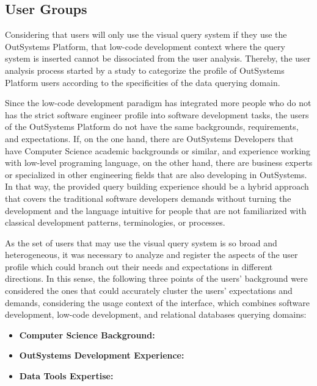 \subsection{User Groups}
\label{subsec:user_groups}

Considering that users will only use the visual query system if they use the OutSystems Platform, that low-code development context where the query system is inserted cannot be dissociated from the user analysis. Thereby, the user analysis process started by a study to categorize the profile of OutSystems Platform users according to the specificities of the data querying domain.

Since the low-code development paradigm has integrated more people who do not has the strict software engineer profile into software development tasks, the users of the OutSystems Platform do not have the same backgrounds, requirements, and expectations. If, on the one hand, there are OutSystems Developers that have Computer Science academic backgrounds or similar, and experience working with low-level programing language, on the other hand, there are business experts or specialized in other engineering fields that are also developing in OutSystems. In that way, the provided query building experience should be a hybrid approach that covers the traditional software developers demands without turning the development and the language intuitive for people that are not familiarized with classical development patterns, terminologies, or processes.

As the set of users that may use the visual query system is so broad and heterogeneous, it was necessary to analyze and register the aspects of the user profile which could branch out their needs and expectations in different directions. In this sense, the following three points of the users' background were considered the ones that could accurately cluster the users' expectations and demands, considering the usage context of the interface, which combines software development, low-code development, and relational databases querying domains:



\begin{itemize}
    \item \textbf{Computer Science Background:}
    \item \textbf{OutSystems Development Experience:}
    \item \textbf{Data Tools Expertise: }
\end{itemize}


